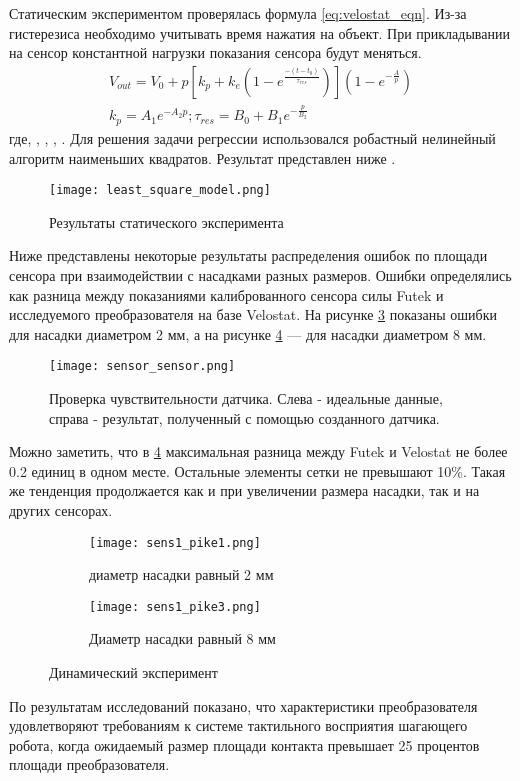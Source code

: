 Статическим экспериментом проверялась формула \eqref{eq:velostat_eqn}. Из-за гистерезиса необходимо учитывать время нажатия на объект. При прикладывании на сенсор константной нагрузки показания сенсора будут меняться.
\begin{align}
    \label{eq:velostat_eqn}
    V_{out} = V_0 + p[k_p + k_e(1-e^\frac{-(t-t_0)}{\tau_{res}})](1-e^{-\frac{A}{p}}) \\
    k_p = A_1e^{-A_2p}; \tau_{res} = B_0 + B_1e^{-\frac{p}{B_2}}
\end{align}
где,  , , , .
Для решения задачи регрессии использовался робастный нелинейный алгоритм наименьших квадратов. Результат представлен ниже .

\begin{figure}[H]
    \centering\texttt{[image: least\_square\_model.png]}
    \caption{Результаты статического эксперимента}
    \label{fig:least_square_model.png}
\end{figure}

Ниже  представлены некоторые результаты распределения ошибок по площади сенсора при взаимодействии с насадками разных размеров. Ошибки определялись как разница между показаниями калиброванного сенсора силы Futek и исследуемого преобразователя на базе Velostat. На рисунке \ref{fig:sens1_pike1} показаны ошибки для насадки диаметром 2 мм, а на рисунке \ref{fig:sens1_pike3} — для насадки диаметром 8 мм.

\begin{figure}[H]
    \centering\texttt{[image: sensor\_sensor.png]}\\
    \caption{Проверка чувствительности датчика. Слева - идеальные данные, справа - результат, полученный с помощью созданного датчика.}
    \label{fig:sensor_sensor}
    \end{figure}

Можно заметить, что в \ref{fig:sens1_pike3} максимальная разница между Futek и Velostat не более 0.2 единиц в одном месте. Остальные элементы сетки не превышают 10\%. Такая же тенденция продолжается как и при увеличении размера насадки, так и на других сенсорах.


\begin{figure}[H]
    \begin{subfigure}{0.49\textwidth}
        \centering\texttt{[image: sens1\_pike1.png]}
        \caption{диаметр насадки равный 2 мм }
        \label{fig:sens1_pike1}
    \end{subfigure}
    \begin{subfigure}{0.49\textwidth}
        \centering\texttt{[image: sens1\_pike3.png]}
        \caption{Диаметр насадки равный 8 мм }
        \label{fig:sens1_pike3}
    \end{subfigure}
    \caption{Динамический эксперимент}
    \label{fig:dynamics_exp}
\end{figure}

По результатам исследований показано, что характеристики преобразователя удовлетворяют требованиям к системе тактильного восприятия шагающего робота, когда ожидаемый размер площади контакта превышает 25 процентов площади преобразователя.